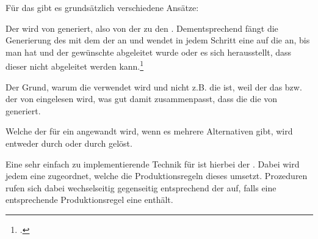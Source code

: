 \begin{Special_Paragraph}
Für das  gibt es grundsätzlich  verschiedene Ansätze:

\begin{itemize}[itemsep=-1mm, topsep=-1mm]
   Der  wird von  generiert, also von der  zu den . Dementsprechend fängt die Generierung des  mit dem  der  an und wendet in jedem Schritt eine  auf die  an, bis man  hat und der gewünschte  abgeleitet wurde oder es sich herausstellt, dass dieser nicht abgeleitet werden kann.\footcite{noauthor_what_nodate-2}

  Der Grund, warum die  verwendet wird und nicht z.B. die  ist, weil der das  bzw. der  von  eingelesen wird, was gut damit zusammenpasst, dass die  die  von  generiert.

  Welche der  für ein  angewandt wird, wenn es mehrere Alternativen gibt, wird entweder durch  oder durch  gelöst.

  Eine sehr einfach zu implementierende Technik für  ist hierbei der . Dabei wird jedem  eine  zugeordnet, welche die Produktionsregeln dieses  umsetzt. Prozeduren rufen sich dabei wechselseitig gegenseitig entsprechend der  auf, falls eine entsprechende Produktionsregel eine  enthält.


\end{itemize}
\end{Special_Paragraph}
